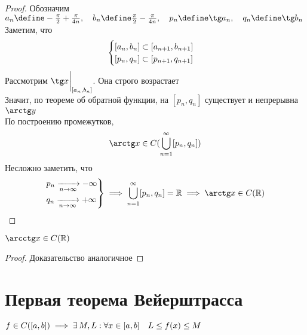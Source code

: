 \begin{proof}
	Обозначим $a_n \define -\frac{\pi}2 + \frac{\pi}{4n}, \quad b_n \define \frac{\pi}2 - \frac{\pi}{4n}, \quad p_n \define \tg a_n, \quad q_n \define \tg b_n $ \\
	Заметим, что
	$$ \begin{cases}
		[a_n, b_n] \subset [a_{n + 1}, b_{n + 1}] \\
		[p_n, q_n] \subset [p_{n + 1}, q_{n + 1}]
	\end{cases} $$
	Рассмотрим $\tg x \clamp{[a_n, b_n]}$. Она строго возрастает \\
	Значит, по теореме об обратной функции, на $[p_n, q_n]$ существует и непрерывна $\arctg y$ \\
	По построению промежутков,
	$$ \arctg x \in C(\bigcup_{n = 1}^\infty [p_n, q_n]) $$
	Несложно заметить, что
	$$ \begin{rcases}
	   	p_n \underarr{n \to \infty} -\infty \\
		q_n \underarr{n \to \infty} +\infty
	\end{rcases} \implies \bigcup_{n = 1}^\infty[p_n, q_n] = \R \implies \arctg x \in C(\R) $$
\end{proof}

\begin{statement}
	$\arcctg x \in C(\R)$
\end{statement}

\begin{proof}
	Доказательство аналогичное
\end{proof}

\section{Первая теорема Вейерштрасса}

\begin{theorem}
	$ f \in C([a, b]) \implies \exists\, M, L : \forall x \in [a, b] \quad L \le f(x) \le M $
\end{theorem}

